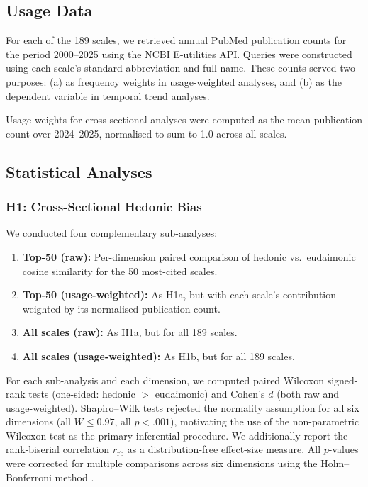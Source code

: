 \documentclass[12pt,a4paper]{article}
\begin{document}
\subsection{Usage Data}\label{sec:usage}

For each of the 189 scales, we retrieved annual PubMed publication counts for the period 2000--2025 using the NCBI E-utilities API.
Queries were constructed using each scale's standard abbreviation and full name.
These counts served two purposes: (a) as frequency weights in usage-weighted analyses, and (b) as the dependent variable in temporal trend analyses.

Usage weights for cross-sectional analyses were computed as the mean publication count over 2024--2025, normalised to sum to 1.0 across all scales.

\subsection{Statistical Analyses}\label{sec:stats}

\subsubsection{H1: Cross-Sectional Hedonic Bias}

We conducted four complementary sub-analyses:
\begin{enumerate}[label=H1\alph*:]
    \item \textbf{Top-50 (raw):} Per-dimension paired comparison of hedonic vs.\ eudaimonic cosine similarity for the 50 most-cited scales.
    \item \textbf{Top-50 (usage-weighted):} As H1a, but with each scale's contribution weighted by its normalised publication count.
    \item \textbf{All scales (raw):} As H1a, but for all 189 scales.
    \item \textbf{All scales (usage-weighted):} As H1b, but for all 189 scales.
\end{enumerate}

For each sub-analysis and each dimension, we computed paired Wilcoxon signed-rank tests (one-sided: hedonic $>$ eudaimonic) and Cohen's $d$ (both raw and usage-weighted).
Shapiro--Wilk tests rejected the normality assumption for all six dimensions (all $W \leq 0.97$, all $p < .001$), motivating the use of the non-parametric Wilcoxon test as the primary inferential procedure.
We additionally report the rank-biserial correlation $r_{\text{rb}}$ as a distribution-free effect-size measure.
All $p$-values were corrected for multiple comparisons across six dimensions using the Holm--Bonferroni method \citep{holm1979simple}.
\end{document}
